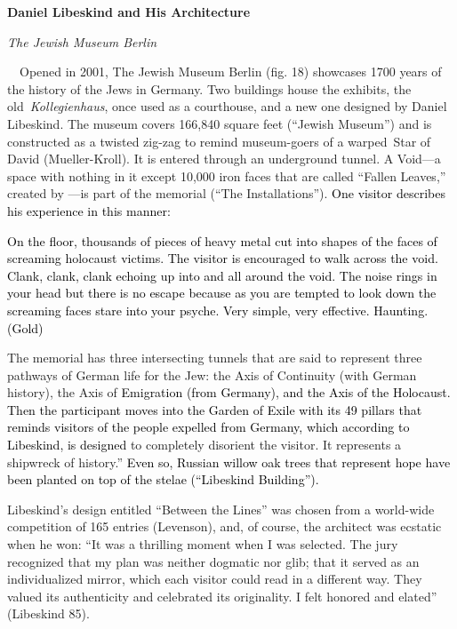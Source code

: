 {\centering
\textbf{Daniel Libeskind and His Architecture}
\par}

\textit{The Jewish Museum Berlin }

\ \  Opened in 2001, The Jewish Museum Berlin (fig. 18) showcases 1700
years of the history of the Jews in Germany.  Two buildings house the
exhibits, the old~\textit{Kollegienhaus}, once used as a courthouse,
and a new one designed by Daniel Libeskind.  The museum covers 166,840
square feet (“Jewish Museum”) and is constructed as a twisted zig-zag
to remind museum-goers of a warped~Star of David (Mueller-Kroll).  It
is entered through an underground tunnel.  A
{\textquotedbl}Void{\textquotedbl}—a space with nothing in it except
10,000 iron faces that are called “Fallen Leaves,” created by
\textstyleappleconvertedspace{\textcolor{black}{an artist from Israel,
Menashe Kadishman}}—is part of the memorial (“The Installations”). 
\textcolor{black}{One visitor describes his experience in this manner:
}

\textcolor{black}{On the floor, thousands of pieces of heavy metal cut
into shapes of the faces of screaming holocaust victims.  The visitor
is encouraged to walk across the void.  Clank, clank, clank echoing up
into and all around the void.  The noise rings in your head but there
is no escape because as you are tempted to look down the screaming
faces stare into your psyche.  Very simple, very effective.  Haunting. 
(Gold) }

The memorial has three intersecting tunnels that are said to represent
three pathways of German life for the Jew: the Axis of Continuity (with
German history), the Axis of \textcolor{black}{Emigration (from
Germany), and the Axis of the Holocaust.  Then the participant moves
into the Garden of Exile with its 49 pillars that reminds visitors of
the people expelled from Germany, which according to Libeskind, is
designed }{\textquotedbl}to completely disorient the visitor.  It
represents a shipwreck of history.”  \textcolor{black}{Even so, Russian
willow oak trees that represent hope have been planted on top of the
stelae (“Libeskind Building”).}\textcolor{black}{  }

Libeskind’s design entitled “Between the Lines” was chosen from a
world-wide competition of 165 entries (Levenson), and, of course, the
architect was ecstatic when he won: “It was a thrilling moment when I
was selected.  The jury recognized that my plan was neither dogmatic
nor glib; that it served as an individualized mirror, which each
visitor could read in a different way.  They valued its authenticity
and celebrated its originality. I felt honored and elated” (Libeskind
85).  

